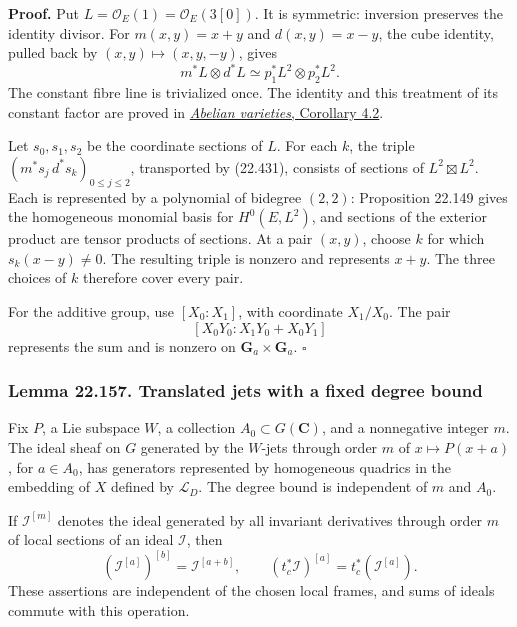 \documentclass[
  11pt,
  a4paper,
]{article}
\begin{document}
\textbf{Proof.} Put \(L=\mathcal O_E(1)=\mathcal O_E(3[0])\). It is
symmetric: inversion preserves the identity divisor. For \(m(x,y)=x+y\)
and \(d(x,y)=x-y\), the cube identity, pulled back by
\((x,y)\mapsto(x,y,-y)\), gives \[
 m^*L\otimes d^*L\simeq p_1^*L^2\otimes p_2^*L^2.
 \tag{22.431}
\] The constant fibre line is trivialized once. The identity and this
treatment of its constant factor are proved in
\href{https://github.com/KokunoYumeto/open-math-courses-public/blob/146dc81802e69cf262fb6cc65c1b9f74e71f4625/docs/courses/AG-GS/src/abelian-varieties.md\#4-the-theorem-of-the-cube-and-the-square}{\emph{Abelian
varieties}, Corollary 4.2}.

Let \(s_0,s_1,s_2\) be the coordinate sections of \(L\). For each \(k\),
the triple \((m^*s_j\,d^*s_k)_{0\le j\le2}\), transported by (22.431),
consists of sections of \(L^2\boxtimes L^2\). Each is represented by a
polynomial of bidegree \((2,2)\): Proposition 22.149 gives the
homogeneous monomial basis for \(H^0(E,L^2)\), and sections of the
exterior product are tensor products of sections. At a pair \((x,y)\),
choose \(k\) for which \(s_k(x-y)\ne0\). The resulting triple is nonzero
and represents \(x+y\). The three choices of \(k\) therefore cover every
pair.

For the additive group, use \([X_0:X_1]\), with coordinate \(X_1/X_0\).
The pair \[
 [X_0Y_0:X_1Y_0+X_0Y_1]
 \tag{22.432}
\] represents the sum and is nonzero on
\(\mathbf G_a\times\mathbf G_a\). \(\square\)

\subsubsection{Lemma 22.157. Translated jets with a fixed degree
bound}\label{lemma-22.157.-translated-jets-with-a-fixed-degree-bound}

Fix \(P\), a Lie subspace \(W\), a collection
\(A_0\subset G(\mathbf C)\), and a nonnegative integer \(m\). The ideal
sheaf on \(G\) generated by the \(W\)-jets through order \(m\) of
\(x\mapsto P(x+a)\), for \(a\in A_0\), has generators represented by
homogeneous quadrics in the embedding of \(X\) defined by
\(\mathcal L_D\). The degree bound is independent of \(m\) and \(A_0\).

If \(\mathcal I^{[m]}\) denotes the ideal generated by all invariant
derivatives through order \(m\) of local sections of an ideal
\(\mathcal I\), then \[
 (\mathcal I^{[a]})^{[b]}=\mathcal I^{[a+b]},
 \qquad
 (t_c^*\mathcal I)^{[a]}=t_c^*(\mathcal I^{[a]}).
 \tag{22.433}
\] These assertions are independent of the chosen local frames, and sums
of ideals commute with this operation.
\end{document}
